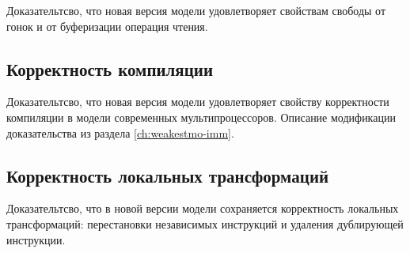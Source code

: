 Доказательтсво, что новая версия модели
удовлетворяет свойствам свободы от гонок и от буферизации операция чтения.

\subsection{Корректность компиляции}

Доказательтсво, что новая версия модели
удовлетворяет свойству корректности компиляции в модели
современных мультипроцессоров.
Описание модификации доказательства из раздела \ref{ch:weakestmo-imm}.

\subsection{Корректность локальных трансформаций}

Доказательтсво, что в новой версии модели
сохраняется корректность локальных трансформаций:
перестановки независимых инструкций и удаления дублирующей инструкции. 

